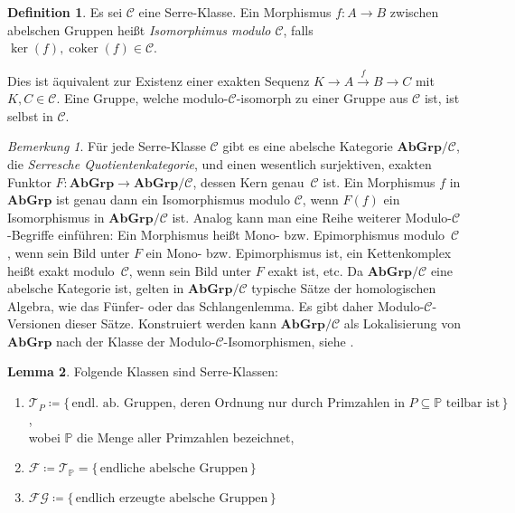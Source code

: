 \documentclass[11pt, a4paper, german]{article}
\theoremstyle{definition}
\newtheorem{lem}{Lemma}
\newtheorem{defn}[lem]{Definition}
\theoremstyle{remark}
\newtheorem*{bem}{Bemerkung}
\DeclareMathOperator{\coker}{coker} %
\newcommand{\SC}{\mathcal{C}} %
\newcommand{\FG}{\mathcal{FG}} %
\newcommand{\T}{\mathcal{T}} %
\newcommand{\F}{\mathcal{F}} %
\newcommand{\Primes}{\mathbb{P}} %
\newcommand{\AbGrp}{\mathbf{AbGrp}} %
\begin{document}
\begin{defn}
  Es sei $\SC$ eine Serre-Klasse.
  Ein Morphismus $f : A \to B$ zwischen abelschen Gruppen heißt \emph{Isomorphimus modulo $\SC$}, falls $\ker(f), \coker(f) \in \SC$. \\
\end{defn}

Dies ist äquivalent zur Existenz einer exakten Sequenz $K \to A \xrightarrow{f} B \to C$ mit $K, C \in \SC$.
Eine Gruppe, welche modulo-$\SC$-isomorph zu einer Gruppe aus $\SC$ ist, ist selbst in $\SC$.

\begin{bem}
  Für jede Serre-Klasse $\SC$ gibt es eine abelsche Kategorie $\AbGrp/\SC$, die \emph{Serresche Quotientenkategorie}, und einen wesentlich surjektiven, exakten Funktor $F : \AbGrp \to \AbGrp/\SC$, dessen Kern genau~$\SC$ ist.
  Ein Morphismus $f$ in $\AbGrp$ ist genau dann ein Isomorphismus modulo $\SC$, wenn $F(f)$ ein Isomorphismus in $\AbGrp/\SC$ ist.
  Analog kann man eine Reihe weiterer Modulo-$\SC$-Begriffe einführen: Ein Morphismus heißt Mono- bzw. Epimorphismus modulo~$\SC$, wenn sein Bild unter $F$ ein Mono- bzw. Epimorphismus ist, ein Kettenkomplex heißt exakt modulo~$\SC$, wenn sein Bild unter $F$ exakt ist, etc.
  Da $\AbGrp/\SC$ eine abelsche Kategorie ist, gelten in $\AbGrp/\SC$ typische Sätze der homologischen Algebra, wie das Fünfer- oder das Schlangenlemma.
  Es gibt daher Modulo-$\SC$-Versionen dieser Sätze.
  Konstruiert werden kann $\AbGrp/\SC$ als Lokalisierung von $\AbGrp$ nach der Klasse der Modulo-$\SC$-Isomorphismen, siehe \cite[\href{http://stacks.math.columbia.edu/tag/02MN}{Section 02MN}]{stacks-project}.
\end{bem}

\begin{lem}
  Folgende Klassen sind Serre-Klassen:
  \begin{enumerate}[label=\alph*)]
    \item $\T_P \coloneqq \{\, \text{endl. ab. Gruppen, deren Ordnung nur durch Primzahlen in $P \subseteq \Primes$ teilbar ist} \,\}$, \\
    wobei $\Primes$ die Menge aller Primzahlen bezeichnet,
    \item $\F \coloneqq \T_\Primes = \{\, \text{endliche abelsche Gruppen} \,\}$
    \item $\FG \coloneqq \{\, \text{endlich erzeugte abelsche Gruppen} \,\}$
  \end{enumerate}
\end{lem}
\end{document}

